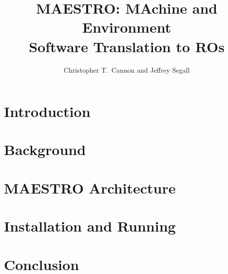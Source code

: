 \documentclass{article}
\title{MAESTRO: MAchine and Environment\\Software Translation to ROs}
\author{Christopher T.~Cannon and Jeffrey Segall}
\begin{document}
\maketitle

\section{Introduction}

\section{Background}

\section{MAESTRO Architecture}

\section{Installation and Running}

\section{Conclusion}
\end{document}
